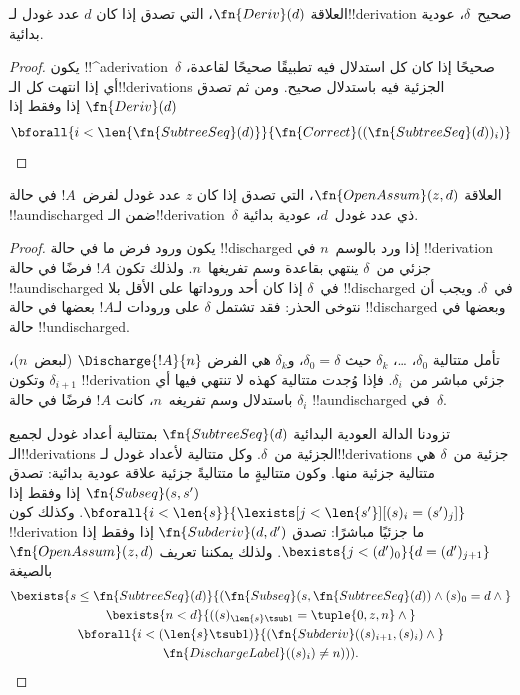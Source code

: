\documentclass[../../../include/open-logic-section]{subfiles}
\begin{document}
\begin{prop}
  العلاقة $\fn{Deriv}(d)$، التي تصدق إذا كان $d$ عدد غودل
  لـ!!{derivation} صحيح~$\delta$، عودية بدائية.
\end{prop}

\begin{proof}
  يكون !!^a{derivation}~$\delta$ صحيحًا إذا كان كل استدلال فيه تطبيقًا
  صحيحًا لقاعدة، أي إذا انتهت كل الـ!!{derivation}s الجزئية فيه باستدلال
  صحيح. ومن ثم تصدق $\fn{Deriv}(d)$ إذا وفقط إذا
  \[
  \bforall{i<\len{\fn{SubtreeSeq}(d)}}{\fn{Correct}((\fn{SubtreeSeq}(d))_i)}
  \]
\end{proof}

\begin{prop}
   العلاقة $\fn{OpenAssum}(z,d)$، التي تصدق
  إذا كان $z$ عدد غودل لفرض~$!A$ في حالة !!a{undischarged} ضمن
  الـ!!{derivation}~$\delta$ ذي عدد غودل~$d$، عودية بدائية.
\end{prop}

\begin{proof}
  يكون ورود فرض ما في حالة !!{discharged} إذا ورد بالوسم~$n$ في
  !!{derivation} جزئي من~$\delta$ ينتهي بقاعدة وسم تفريغها~$n$. ولذلك
  تكون $!A$ فرضًا في حالة !!a{undischarged} في~$\delta$ إذا كان أحد وروداتها
  على الأقل بلا !!{discharged} في~$\delta$. ويجب أن نتوخى الحذر: فقد تشتمل
  $\delta$ على ورودات لـ$!A$ بعضها في حالة !!{discharged} وبعضها
  في حالة !!{undischarged}.

  تأمل متتالية $\delta_0$، \dots، $\delta_k$ حيث $\delta_0=\delta$،
  و$\delta_k$ هي الفرض $\Discharge{!A}{n}$ (لبعض~$n$)، وتكون
  $\delta_{i+1}$ !!{derivation} جزئي مباشر من~$\delta_i$. فإذا وُجدت
  متتالية كهذه لا تنتهي فيها أي $\delta_i$ باستدلال وسم تفريغه~$n$،
  كانت $!A$ فرضًا في حالة !!a{undischarged} في~$\delta$.

  تزودنا الدالة العودية البدائية $\fn{SubtreeSeq}(d)$ بمتتالية أعداد
  غودل لجميع الـ!!{derivation}s الجزئية من~$\delta$. وكل متتالية لأعداد
  غودل لـ!!{derivation}s جزئية من~$\delta$ هي متتالية جزئية منها. وكون
  متتاليةٍ ما متتاليةً جزئية علاقة عودية بدائية: تصدق
  $\fn{Subseq}(s,s')$ إذا وفقط إذا
  $\bforall{i<\len{s}}{\lexists[j<\len{s'}][(s)_i=(s')_j]}$. وكذلك
  كون !!{derivation} ما جزئيًا مباشرًا: تصدق
  $\fn{Subderiv}(d,d')$ إذا وفقط إذا
  $\bexists{j<(d')_0}{d=(d')_{j+1}}$. ولذلك يمكننا تعريف
  $\fn{OpenAssum}(z,d)$ بالصيغة
  \begin{multline*}
    \bexists{s\leq\fn{SubtreeSeq}(d)}{(\fn{Subseq}(s, \fn{SubtreeSeq}(d))
      \land (s)_0 = d \land {}} \\
    \bexists{n<d}{((s)_{\len{s} \tsub 1} = \tuple{0, z, n} \land {}}\\
      \bforall{i<(\len{s} \tsub 1)}{(\fn{Subderiv}((s)_{i+1}, (s)_i) \land {}}\\
      \fn{DischargeLabel}((s)_i) \neq n))).
  \end{multline*}
\end{proof}
\end{document}
